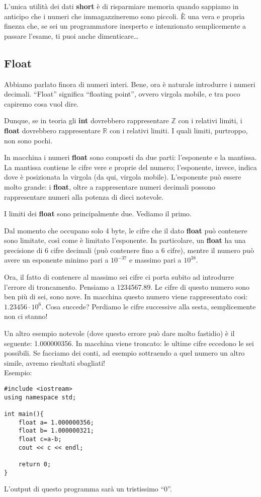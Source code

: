 	L'unica utilità dei dati \textbf{short} è di risparmiare memoria quando sappiamo in anticipo che i numeri che immagazzineremo sono piccoli. \`E una vera e propria finezza che, se sei un programmatore inesperto e intenzionato semplicemente a passare l'esame, ti puoi anche dimenticare\ldots
	
	
	
	\subsection{Float}
	Abbiamo parlato finora di numeri interi. Bene, ora è naturale introdurre i numeri decimali. ``Float'' significa ``floating point'', ovvero virgola mobile, e tra poco capiremo cosa vuol dire.
	
	Dunque, se in teoria gli \textbf{int} dovrebbero rappresentare $\mathbb{Z}$ con i relativi limiti, i \textbf{float} dovrebbero rappresentare $\mathbb{R}$ con i relativi limiti. I quali limiti, purtroppo, non sono pochi. 
	
	In macchina i numeri \textbf{float} sono composti da due parti: l'esponente e la mantissa. La mantissa contiene le cifre vere e proprie del numero; l'esponente, invece, indica dove è posizionata la virgola (da qui, virgola mobile). L'esponente può essere molto grande: i \textbf{float}, oltre a rappresentare numeri decimali possono rappresentare numeri alla potenza di dieci notevole.  
	
	I limiti dei \textbf{float} sono principalmente due. Vediamo il primo.
	
	Dal momento che occupano solo 4 byte, le cifre che il dato \textbf{float} può contenere sono limitate, così come è limitato l'esponente. In particolare, un \textbf{float} ha una precisione di 6 cifre decimali (può contenere fino a 6 cifre), mentre il numero può avere un esponente minimo pari a $10^{-37}$ e massimo pari a $10^{38}$.
	
	Ora, il fatto di contenere al massimo sei cifre ci porta subito ad introdurre l'errore di troncamento. Pensiamo a 1234567.89. Le cifre di questo numero sono ben più di sei, sono nove. In macchina questo numero viene rappresentato così: $1.23456\cdotp10^6$. Cosa succede? Perdiamo le cifre successive alla sesta, semplicemente non ci stanno!
	
	Un altro esempio notevole (dove questo errore può dare molto fastidio) è il seguente: 1.000000356. In macchina viene troncato: le ultime cifre eccedono le sei possibili. Se facciamo dei conti, ad esempio sottraendo a quel numero un altro simile, avremo risultati sbagliati! 
	\\Esempio:
	\begin{lstlisting}
#include <iostream>
using namespace std;

int main(){
	float a= 1.000000356;
	float b= 1.000000321;
	float c=a-b;
	cout << c << endl;

	return 0;
}
	\end{lstlisting}
	L'output di questo programma sarà un tristissimo ``0''.
	\\
	
